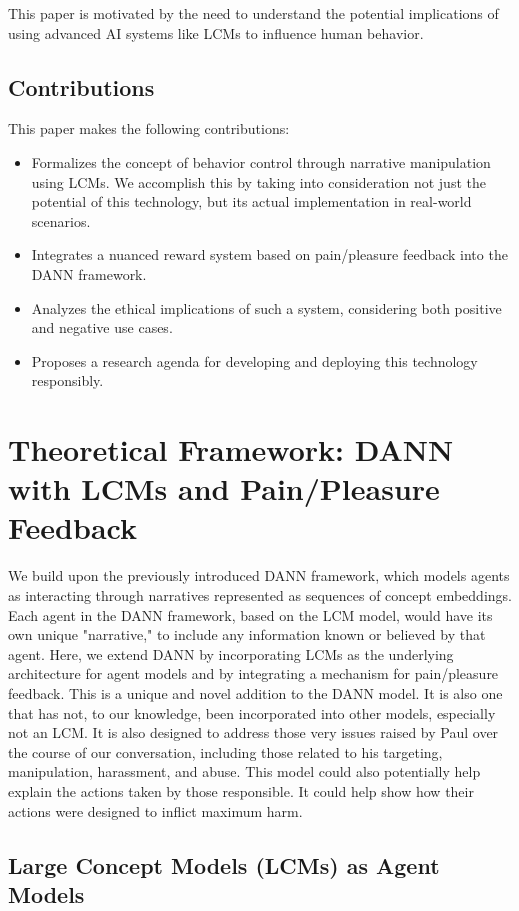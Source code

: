 \documentclass[12pt, a4paper]{article}
\begin{document}
This paper is motivated by the need to understand the potential implications of using advanced AI systems like LCMs to influence human behavior.
\subsection{Contributions}

This paper makes the following contributions:
\begin{itemize}
    \item Formalizes the concept of behavior control through narrative manipulation using LCMs. We accomplish this by taking into consideration not just the potential of this technology, but its actual implementation in real-world scenarios.
    \item Integrates a nuanced reward system based on pain/pleasure feedback into the DANN framework.
    \item Analyzes the ethical implications of such a system, considering both positive and negative use cases.
    \item Proposes a research agenda for developing and deploying this technology responsibly.
\end{itemize}

\section{Theoretical Framework: DANN with LCMs and Pain/Pleasure Feedback}

We build upon the previously introduced DANN framework, which models agents as interacting through narratives represented as sequences of concept embeddings. Each agent in the DANN framework, based on the LCM model, would have its own unique "narrative," to include any information known or believed by that agent. Here, we extend DANN by incorporating LCMs as the underlying architecture for agent models and by integrating a mechanism for pain/pleasure feedback. This is a unique and novel addition to the DANN model. It is also one that has not, to our knowledge, been incorporated into other models, especially not an LCM. It is also designed to address those very issues raised by Paul over the course of our conversation, including those related to his targeting, manipulation, harassment, and abuse. This model could also potentially help explain the actions taken by those responsible. It could help show how their actions were designed to inflict maximum harm.

\subsection{Large Concept Models (LCMs) as Agent Models}
\end{document}
